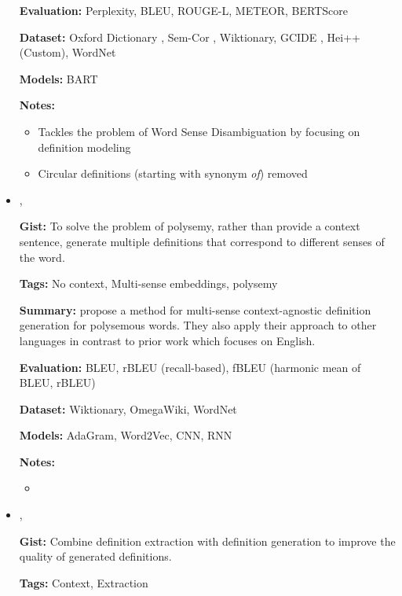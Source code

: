 \documentclass{article}[a4paper]
\newcommand{\bitem}[2]{
    \item[\cite{#1}]
        \textbf{\citetitle{#1}}

        \citeauthor{#1}, \citeyear{#1}
        \newline\newline
        {#2}
}%
\begin{document}
\begin{itemize}
{        \textbf{Evaluation:}
        Perplexity, BLEU, ROUGE-L, METEOR, BERTScore

        \textbf{Dataset:}
        Oxford Dictionary \cite{chang_what_2019},
        Sem-Cor \cite{miller_semantic_1993},
        Wiktionary,
        GCIDE \cite{noraset_definition_2016},
        Hei++ (Custom),
        WordNet

        \textbf{Models:}
        BART

        \textbf{Notes:}
        \begin{itemize}
            \item Tackles the problem of Word Sense Disambiguation by
                  focusing on definition modeling
            \item Circular definitions (starting with synonym \textit{of})
                  removed
        \end{itemize}
    }%

    \bitem{sojka_evaluating_2020}%
    {%
        \textbf{Gist:}
        To solve the problem of polysemy, rather than provide a context
        sentence, generate multiple definitions that correspond to different
        senses of the word.

        \textbf{Tags:}
        No context, Multi-sense embeddings, polysemy

        \textbf{Summary:}
        \citeauthor{sojka_evaluating_2020} propose a method for multi-sense
        context-agnostic definition generation for polysemous words. They also
        apply their approach to other languages in contrast to prior work which
        focuses on English.

        \textbf{Evaluation:}
        BLEU,
        rBLEU (recall-based),
        fBLEU (harmonic mean of BLEU, rBLEU)

        \textbf{Dataset:}
        Wiktionary,
        OmegaWiki,
        WordNet

        \textbf{Models:}
        AdaGram, Word2Vec, CNN, RNN

        \textbf{Notes:}
        \begin{itemize}
            \item
        \end{itemize}
    }%

    \bitem{huang_cdm_2021}%
    {%
        \textbf{Gist:}
        Combine definition extraction with definition generation to improve
        the quality of generated definitions.

        \textbf{Tags:}
        Context, Extraction

}
\end{itemize}
\end{document}
